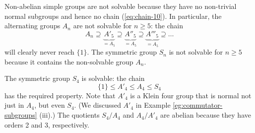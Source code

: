 \begin{examples}
	Non-abelian simple groups are not solvable because they have no non-trivial normal subgroups and hence no chain (\ref{eq:chain-10}). In particular, the alternating groups $A_n$ are not solvable for $n \geq 5$: the chain
	\[
		A_n \supseteq \underbrace{A'_5}_{= A_5} \supseteq \underbrace{A''_5}_{= A_5} \supseteq \underbrace{A'''_5}_{= A_5} \supseteq \dots
	\]
	will clearly never reach $\{1\}$. The symmetric group $S_n$ is not solvable for $n \geq 5$ because it contains the non-solvable group $A_n$.
	
	The symmetric group $S_4$ is solvable: the chain
	\[
		\{1\} \leq A'_4 \leq A_4 \leq S_4
	\]
	has the required property. Note that $A'_4$ is a Klein four group that is normal not just in $A_4$, but even $S_4$. (We discussed $A'_4$ in Example \ref{eg:commutator-subgroups} (iii).) The quotients $S_4 / A_4$ and $A_4 / A'_4$ are abelian because they have orders 2 and 3, respectively.
\end{examples}

